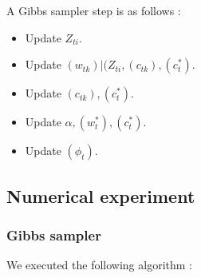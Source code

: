 \documentclass{article}
\begin{document}
A Gibbs sampler step is as follows :
\begin{itemize}
\item Update $Z_{ti}$.
\item Update $(w_{tk})\vert(Z_{ti},(c_{tk}),(c_t^*)$.
\item Update $(c_{tk}),(c_t^*)$.
\item Update $\alpha, (w_t^*),(c_t^*)$.
\item Update $(\phi_t)$.
\end{itemize}

\subsection{Numerical experiment}

\subsubsection{Gibbs sampler}

We executed the following algorithm :
\end{document}
